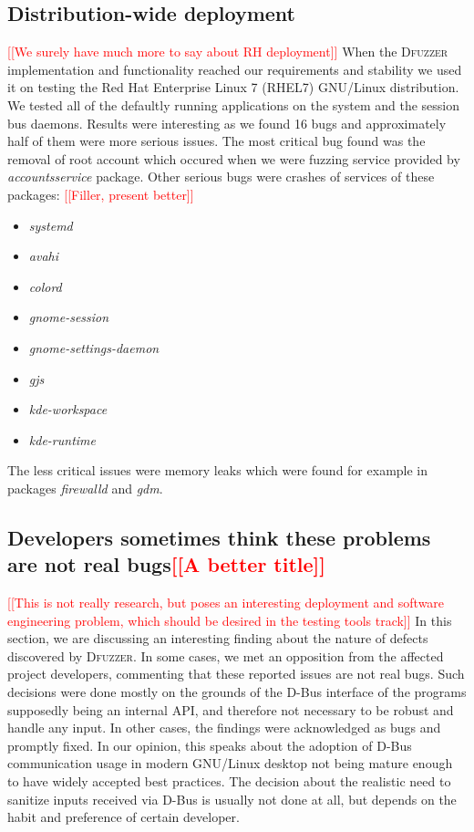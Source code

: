 \documentclass[conference]{IEEEtran}
\newcommand{\addtodo}[1]{\textcolor{red}{[[#1]]}}
\begin{document}
\subsection{Distribution-wide deployment}
\addtodo{We surely have much more to say about RH deployment}
When the \textsc{Dfuzzer} implementation and functionality reached our requirements
and stability we used it on testing the Red Hat Enterprise Linux 7 (RHEL7)
GNU/Linux distribution. We tested all of the defaultly running applications
on the system and the session bus daemons. Results were interesting as we found
16 bugs and approximately half of them were more serious issues. The most
critical bug found was the removal of root account which occured when we were
fuzzing service provided by \emph{accountsservice} package. Other serious bugs
were crashes of services of these packages:
\addtodo{Filler, present better}
\begin{itemize}
	\item \emph{systemd}
	\item \emph{avahi}
	\item \emph{colord}
	\item \emph{gnome-session}
	\item \emph{gnome-settings-daemon}
	\item \emph{gjs}
	\item \emph{kde-workspace}
	\item \emph{kde-runtime}
\end{itemize}
The less critical issues were memory leaks which were found for example in packages
\emph{firewalld} and \emph{gdm}.


\subsection{Developers sometimes think these problems are not real bugs\addtodo{A better title}}
\addtodo{This is not really research, but poses an interesting deployment and
software engineering problem, which should be desired in the testing tools
track}
In this section, we are discussing an interesting finding about the nature of
defects discovered by \textsc{Dfuzzer}. In some cases, we met an opposition from
the affected project developers, commenting that these reported issues are not
real bugs. Such decisions were done mostly on the grounds of the D-Bus interface
of the programs supposedly being an internal API, and therefore not necessary to be robust and handle any input. In other cases, the findings were acknowledged as bugs and promptly fixed. In our opinion, this speaks about the
adoption of D-Bus communication usage in modern GNU/Linux desktop not being
mature enough to have widely accepted best practices. The decision about the
realistic need to sanitize inputs received via D-Bus is usually not done at all,
but depends on the habit and preference of certain developer.
\end{document}

